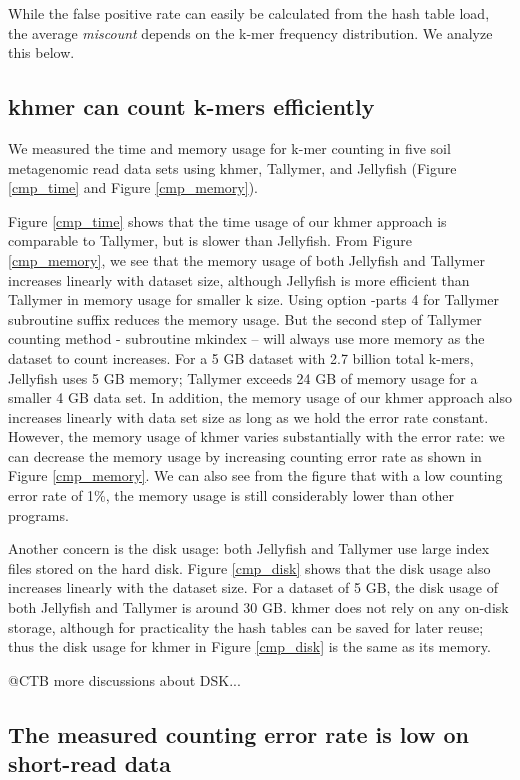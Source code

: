 \documentclass{article}
\begin{document}
While the false positive rate can easily be calculated from the hash
table load, the average {\em miscount} depends on the k-mer frequency
distribution.  We analyze this below.

\subsection{khmer can count k-mers efficiently}

We measured the time and memory usage for k-mer counting in five soil
metagenomic read data sets using khmer, Tallymer, and Jellyfish
(Figure \ref{cmp_time} and Figure \ref{cmp_memory}).

Figure \ref{cmp_time} shows that the time usage of our khmer approach
is comparable to Tallymer, but is slower than Jellyfish. From Figure
\ref{cmp_memory}, we see that the memory usage of both Jellyfish and
Tallymer increases linearly with dataset size, although Jellyfish is
more efficient than Tallymer in memory usage for smaller k size. Using
option -parts 4 for Tallymer subroutine suffix reduces the memory
usage. But the second step of Tallymer counting method - subroutine
mkindex -- will always use more memory as the dataset to count
increases.  For a 5 GB dataset with 2.7 billion total k-mers,
Jellyfish uses 5 GB memory; Tallymer exceeds 24 GB of memory usage for
a smaller 4 GB data set.
In addition, the memory usage of our khmer approach also increases
linearly with data set size as long as we hold the error rate
constant.  However, the memory usage of khmer varies substantially
with the error rate: we can decrease the memory usage by increasing
counting error rate as shown in Figure \ref{cmp_memory}.  We can also
see from the figure that with a low counting error rate of 1\%, the
memory usage is still considerably lower than other programs.

Another concern is the disk usage: both Jellyfish and Tallymer use
large index files stored on the hard disk.  Figure \ref{cmp_disk}
shows that the disk usage also increases linearly with the dataset
size. For a dataset of 5 GB, the disk usage of both Jellyfish and
Tallymer is around 30 GB.  khmer does not rely on any on-disk storage,
although for practicality the hash tables can be saved for later
reuse; thus the disk usage for khmer in Figure \ref{cmp_disk} is the
same as its memory.

@CTB more discussions about DSK...

\subsection{The measured counting error rate is low on short-read data}
\end{document}
